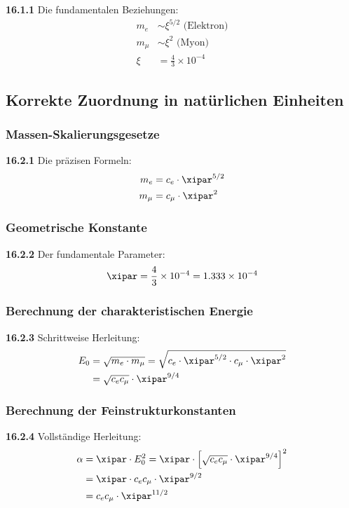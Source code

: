 \noindent \textbf{16.1.1} Die fundamentalen Beziehungen:
\begin{align}
	m_e &\sim \xi^{5/2} \text{ (Elektron)} \\
	m_\mu &\sim \xi^2 \text{ (Myon)} \\
	\xi &= \frac{4}{3} \times 10^{-4} 
\end{align}

\subsection{Korrekte Zuordnung in natürlichen Einheiten}

\subsubsection{Massen-Skalierungsgesetze}
\noindent \textbf{16.2.1} Die präzisen Formeln:
\begin{align}
	m_e &= c_e \cdot \xipar^{5/2} \\
	m_\mu &= c_\mu \cdot \xipar^2
\end{align}

\subsubsection{Geometrische Konstante}
\noindent \textbf{16.2.2} Der fundamentale Parameter:
\begin{equation}
	\xipar = \frac{4}{3} \times 10^{-4} = 1.333 \times 10^{-4}
\end{equation}

\subsubsection{Berechnung der charakteristischen Energie}
\noindent \textbf{16.2.3} Schrittweise Herleitung:
\begin{align}
	E_0 &= \sqrt{m_e \cdot m_\mu} = \sqrt{c_e \cdot \xipar^{5/2} \cdot c_\mu \cdot \xipar^2} \\
	&= \sqrt{c_e c_\mu} \cdot \xipar^{9/4}
\end{align}

\subsubsection{Berechnung der Feinstrukturkonstanten}
\noindent \textbf{16.2.4} Vollständige Herleitung:
\begin{align}
	\alpha &= \xipar \cdot E_0^2 = \xipar \cdot \left[ \sqrt{c_e c_\mu} \cdot \xipar^{9/4} \right]^2 \\
	&= \xipar \cdot c_e c_\mu \cdot \xipar^{9/2} \\
	&= c_e c_\mu \cdot \xipar^{11/2}
\end{align}

